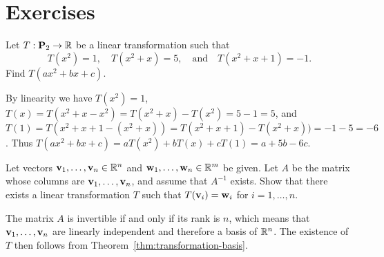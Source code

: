 \section*{Exercises}

\begin{ex}
  Let $T:\mathbf{P}_2 \to \mathbb{R}$ be a linear transformation such that
  \begin{equation*}
    T(x^2)=1,
    \quad
    T(x^2+x)=5,
    \quad\mbox{and}\quad
    T(x^2+x+1)=-1.
  \end{equation*}
  Find $T(ax^2+bx+c)$.
  \begin{sol}
    By linearity we have
    $T(x^2)=1$, $T(x) = T(x^2+x - x^2)= T(x^2+x) - T(x^2)= 5-1=5$, and
    $T(1) = T(x^2+x+1 -(x^2+x))=T(x^2+x+1) -T(x^2+x))= -1-5=-6$.
    Thus $T(ax^2+bx+c) = aT(x^2) + bT(x) + cT(1) = a+5b-6c$.
  \end{sol}
\end{ex}

\begin{ex}
  Let vectors $\mbox{\bf v}_1,\ldots,\mbox{\bf v}_n\in\mathbb{R}^n$ and
  $\mbox{\bf w}_1,\ldots,\mbox{\bf w}_n\in\mathbb{R}^m$ be given. Let $A$ be the
  matrix whose columns are $\mbox{\bf v}_1,\ldots,\mbox{\bf v}_n$, and assume
  that $A^{-1}$ exists. Show that there exists a linear transformation
  $T$ such that $T(\mbox{\bf v}_i)=\mbox{\bf w}_i$ for $i=1,\ldots,n$.
  \begin{sol}
    The matrix $A$ is invertible if and only if its rank is $n$, which
    means that $\mbox{\bf v}_1,\ldots,\mbox{\bf v}_n$ are linearly independent
    and therefore a basis of $\mathbb{R}^n$. The existence of $T$ then follows
    from Theorem~\ref{thm:transformation-basis}.
  \end{sol}
\end{ex}

